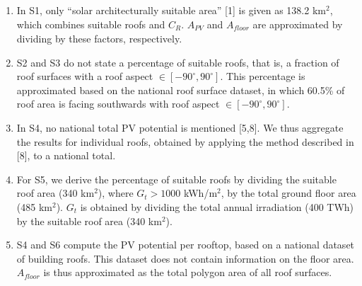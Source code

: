 \begin{enumerate}[label=(\alph*)]
    \item In S1, only “solar architecturally suitable area” [1] is given as 138.2 km$^2$, which combines suitable roofs and $C_R$. $A_{PV}$ and $A_{\mathit{floor}}$ are approximated by dividing by these factors, respectively.
    \item S2 and S3 do not state a percentage of suitable roofs, that is, a fraction of roof surfaces with a roof aspect $\in [-90^\circ, 90^\circ]$. This percentage is approximated based on the national roof surface dataset, in which 60.5\% of roof area is facing southwards with roof aspect $\in [-90^\circ, 90^\circ]$.
	\item In S4, no national total PV potential is mentioned [5,8]. We thus aggregate the results for individual roofs, obtained by applying the method described in [8], to a national total.
	\item For S5, we derive the percentage of suitable roofs by dividing the suitable roof area (340 km$^2$), where $G_t > 1000$ kWh/m$^2$, by the total ground floor area (485 km$^2$). $G_t$ is obtained by dividing the total annual irradiation (400 TWh) by the suitable roof area (340 km$^2$).  
	\item S4 and S6 compute the PV potential per rooftop, based on a national dataset of building roofs. This dataset does not contain information on the floor area. $A_{\mathit{floor}}$ is thus approximated as the total polygon area of all roof surfaces.
\end{enumerate}
	
